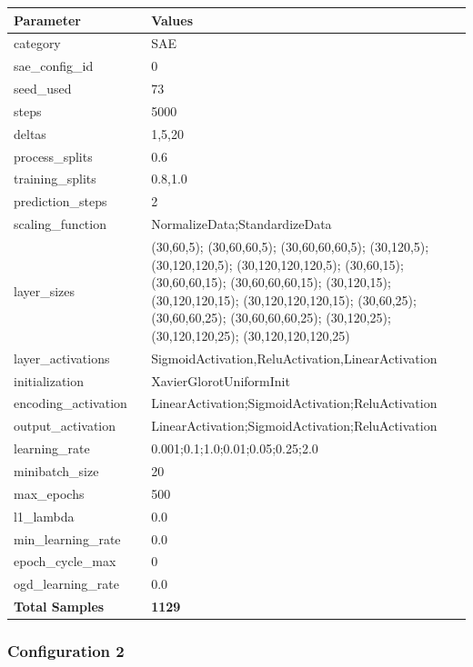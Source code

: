 \documentclass[a4paper,11pt,oneside]{article}
\theoremstyle{plain}
\theoremstyle{definition}
\begin{document}
	\begin{longtable}[H]{|p{0.3\linewidth}|p{0.7\linewidth}|} \hline \textbf{Parameter} &\textbf{Values} \\\hline{category} & {SAE} \\\hline
		{sae\_config\_id} & {0} \\\hline
		{seed\_used} & {73} \\\hline
		{steps} & {5000} \\\hline
		{deltas} & {1,5,20} \\\hline
		{process\_splits} & {0.6} \\\hline
		{training\_splits} & {0.8,1.0} \\\hline
		{prediction\_steps} & {2} \\\hline
		{scaling\_function} & {NormalizeData;StandardizeData} \\\hline
		{layer\_sizes} & {(30,60,5); (30,60,60,5); (30,60,60,60,5); (30,120,5); (30,120,120,5); (30,120,120,120,5); (30,60,15); (30,60,60,15); (30,60,60,60,15); (30,120,15); (30,120,120,15); (30,120,120,120,15); (30,60,25); (30,60,60,25); (30,60,60,60,25); (30,120,25); (30,120,120,25); (30,120,120,120,25)} \\\hline
		{layer\_activations} & {SigmoidActivation,ReluActivation,LinearActivation} \\\hline
		{initialization} & {XavierGlorotUniformInit} \\\hline
		{encoding\_activation} & {LinearActivation;SigmoidActivation;ReluActivation} \\\hline
		{output\_activation} & {LinearActivation;SigmoidActivation;ReluActivation} \\\hline
		{learning\_rate} & {0.001;0.1;1.0;0.01;0.05;0.25;2.0} \\\hline
		{minibatch\_size} & {20} \\\hline
		{max\_epochs} & {500} \\\hline
		{l1\_lambda} & {0.0} \\\hline
		{min\_learning\_rate} & {0.0} \\\hline
		{epoch\_cycle\_max} & {0} \\\hline
		{ogd\_learning\_rate} & {0.0} \\\hline
		{\textbf{Total Samples}} & {\textbf{1129}} \\\hline
	\end{longtable}
	
	
	\newpage
	\subsubsection{Configuration 2}\label{config2}
\end{document}

